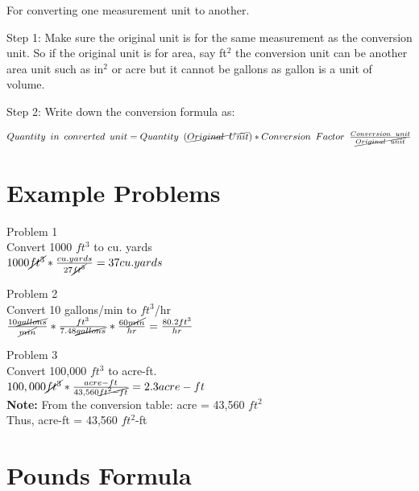 For converting one measurement unit to another.

Step 1:  Make sure the original unit is for the same measurement as the conversion unit.  So if the original unit is for area, say ft$^2$ the conversion unit can be another area unit such as in$^2$ or acre but it cannot be gallons as gallon is a unit of volume.

Step 2: Write down the conversion formula as:

$Quantity \enspace in \enspace converted \enspace unit = Quantity \enspace (\cancel{Original \enspace Unit}) *   Conversion  \enspace Factor \enspace  \frac{Conversion \enspace unit}{\cancel{Original \enspace unit}}$


\section{Example Problems}
Problem 1\\
Convert 1000 $ft^3$ to cu. yards\\

$1000 \cancel{ft^3}*\frac{cu.yards}{27\cancel{ft^3}} = 37 cu.yards$

Problem 2\\
Convert 10 gallons/min to $ft^3$/hr\\

$\frac{10 \cancel{gallons}}{\cancel{min}}*  \frac{ft^3}{7.48 \cancel{gallons}}  * \frac{60 \cancel{min}}{hr}   = \frac{80.2ft^3}{hr}$


Problem 3\\
Convert 100,000 $ft^3$ to acre-ft.\\
$100,000 \cancel{ft^3} * \frac{acre-ft}{43,560 \cancel{ft^2-ft}} =  2.3 acre-ft$\\
\textbf{Note:} From the conversion table: acre = 43,560 $ft^2$\\
Thus, acre-ft  = 43,560 $ft^2$-ft\\

\section{Pounds Formula}

